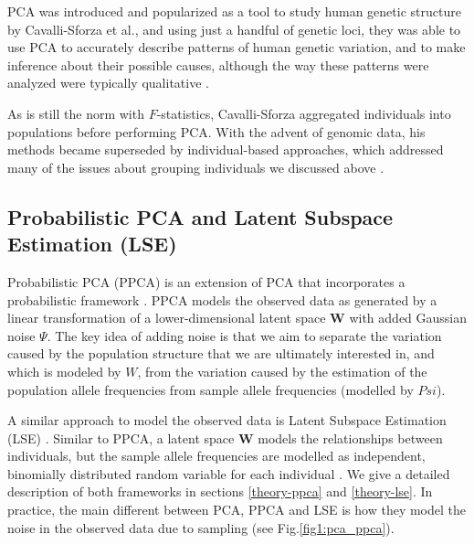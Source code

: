 \documentclass[12pt, letterpaper]{article}
\begin{document}
PCA was introduced and popularized as a tool to study human genetic structure by Cavalli-Sforza et al., and using just a handful of genetic loci, they was able to use PCA to accurately describe patterns of human genetic variation, and to make inference about their possible causes, although the way these patterns were analyzed were typically qualitative \cite{menozzi_synthetic_1978, sforza_great_1995, noauthor_cavalli-sforza_nodate}.

As is still the norm with $F$-statistics, Cavalli-Sforza aggregated individuals into populations before performing PCA. With the advent of genomic data, his methods became superseded by individual-based approaches, which addressed many of the issues about grouping individuals we discussed above \cite{patterson_population_2006, novembre_genes_2008, price_principal_2006}.

\subsection{Probabilistic PCA and Latent Subspace Estimation (LSE)}

Probabilistic PCA (PPCA) is an extension of PCA that incorporates a probabilistic framework \cite{tipping_probabilistic_nodate}. PPCA models the observed data as generated by a linear transformation of a lower-dimensional latent space $\mathbf{W}$ with added Gaussian noise $\Psi$. 
The key idea of adding noise is that we aim to separate the variation caused by the population structure that we are ultimately interested in, and which is modeled by $W$, from the variation caused by the estimation of the population allele frequencies from sample allele frequencies (modelled by $Psi$).


A similar approach to model the observed data is Latent Subspace Estimation (LSE) \cite{cabreros_likelihood-free_2019}. Similar to PPCA, a latent space $\mathbf{W}$ models the relationships between individuals, but the  sample allele frequencies are modelled as independent, binomially distributed random variable for each individual \cite{van_waaij_evaluation_2023, cabreros_likelihood-free_2019, chen_consistent_2015}. We give a detailed description of both frameworks in sections \ref{theory-ppca} and \ref{theory-lse}. In practice, the main different between PCA, PPCA and LSE is how they model the noise in the observed data due to sampling (see Fig.\ref{fig1:pca_ppca}). 
\end{document}
